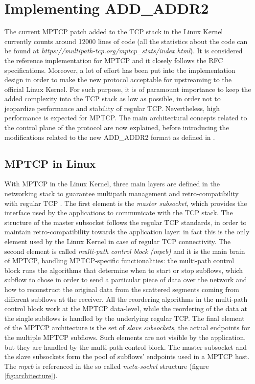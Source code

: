 \section{Implementing ADD\_ADDR2}
The current MPTCP patch added to the TCP stack in the Linux Kernel currently counts around 12000 lines of code (all the statistics about the code can be found at \textit{https://multipath-tcp.org/mptcp\_stats/index.html}). It is considered the reference implementation for MPTCP and it closely follows the RFC specifications. Moreover, a lot of effort has been put into the implementation design in order to make the new protocol acceptable for upstreaming to the official Linux Kernel. For such purpose, it is of paramount importance to keep the added complexity into the TCP stack as low as possible, in order not to jeopardize performance and stability of regular TCP. Nevertheless, high performance is expected for MPTCP. The main architectural concepts related to the control plane of the protocol are now explained, before introducing the modifications related to the new ADD\_ADDR2 format as defined in . 

\subsection{MPTCP in Linux}
With MPTCP in the Linux Kernel, three main layers are defined in the networking stack to guarantee multipath management and retro-compatibility with regular TCP \cite{BPB11}. The first element is the \textit{master subsocket}, which provides the interface used by the applications to communicate with the TCP stack. The structure of the master subsocket follows the regular TCP standards, in order to maintain retro-compatibility towards the application layer: in fact this is the only element used by the Linux Kernel in case of regular TCP connectivity. The second element is called \textit{multi-path control block (mpcb)} and it is the main brain of MPTCP, handling MPTCP-specific functionalities: the multi-path control block runs the algorithms that determine when to start or stop subflows, which subflow to chose in order to send a particular piece of data over the network and how to reconstruct the original data from the scattered segments coming from different subflows at the receiver. All the reordering algorithms in the multi-path control block work at the MPTCP data-level, while the reordering of the data at the single subflows is handled by the underlying regular TCP. The final element of the MPTCP architecture is the set of \textit{slave subsockets}, the actual endpoints for the multiple MPTCP subflows. Such elements are not visible by the application, but they are handled by the multi-path control block. The master subsocket and the slave subsockets form the pool of subflows' endpoints used in a MPTCP host. The \textit{mpcb} is referenced in the so called \textit{meta-socket} structure (figure \ref{fig:architecture}).

